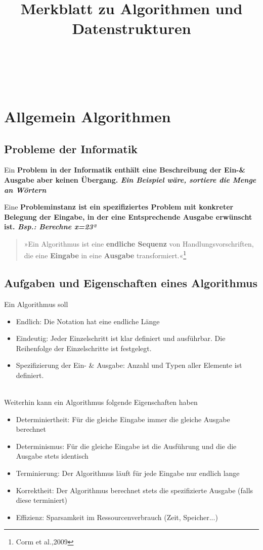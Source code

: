 \documentclass[jou,apacite]{apa6}
\title{Merkblatt zu Algorithmen und Datenstrukturen}
\begin{document}
\maketitle    
\tableofcontents 

\\
\\
\section{Allgemein Algorithmen}

\subsection{Probleme der Informatik}
Ein \bfseries Problem \normalfont in der Informatik enthält eine Beschreibung der Ein-& Ausgabe aber keinen Übergang. \itshape Ein Beispiel wäre, sortiere die Menge an Wörtern \normalfont

Eine \bfseries Probleminstanz \normalfont ist ein spezifiziertes Problem mit konkreter Belegung der Eingabe, in der eine Entsprechende Ausgabe erwünscht ist. {\itshape Bsp.: Berechne x=23²}

\begin{quote}
    »Ein Algorithmus ist eine {\bfseries endliche Sequenz} von Handlungsvorschriften, die eine {\bfseries Eingabe} in eine {\bfseries Ausgabe} transformiert.«\footnote{Corm et al.,2009}
\end{quote}

\subsection{Aufgaben und Eigenschaften eines Algorithmus}
Ein Algorithmus soll
\begin{itemize}
\item Endlich: Die Notation hat eine endliche Länge
\item Eindeutig: Jeder Einzelschritt ist klar definiert und ausführbar. Die Reihenfolge der Einzelschritte ist festgelegt. 
\item Spezifizierung der Ein- & Ausgabe: Anzahl und Typen aller Elemente ist definiert.
\end{itemize}
\\
Weiterhin kann ein Algorithmus folgende Eigenschaften haben 
\begin{itemize}
\item Determiniertheit: Für die gleiche Eingabe immer die gleiche Ausgabe berechnet
\item Determinismus: Für die gleiche Eingabe ist die Ausführung und die die Ausgabe stets identisch
\item Terminierung: Der Algorithmus läuft für jede Eingabe nur endlich lange
\item Korrektheit: Der Algorithmus berechnet stets die spezifizierte Ausgabe (falls diese terminiert)
\item Effizienz: Sparsamkeit im Ressourcenverbrauch (Zeit, Speicher...)
\end{itemize}
\end{document}
